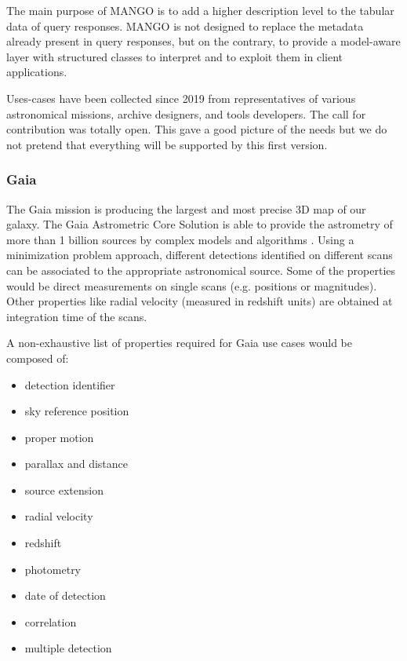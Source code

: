 The main purpose of MANGO is to add a higher description level to the tabular data of query responses.
MANGO is not designed to replace the metadata already present in query responses, but on the contrary, 
to provide a model-aware layer with structured classes to interpret and to exploit them in client applications. 

Uses-cases have been collected since 2019 from representatives of various astronomical 
missions, archive designers, and tools developers.
The call for contribution was totally open. This gave a good picture of the needs but we do not pretend 
that everything will be supported by this first version.

\subsubsection{Gaia}
The Gaia mission is producing the largest and most precise 3D map of our galaxy.
The Gaia Astrometric Core Solution is able to provide the astrometry of more than 1
billion sources by complex models and algorithms \citep{2012A&A...538A..78L}.
Using a minimization problem approach, different detections identified on
different scans can be associated to the appropriate astronomical source. Some of the
properties would be direct measurements on single scans (e.g. positions or
magnitudes). Other properties like radial velocity (measured in redshift
units) are obtained at integration time of the scans.

A non-exhaustive list of properties required for Gaia use cases would be composed
of:

\begin{itemize}[noitemsep,topsep=0pt,parsep=0pt,partopsep=0pt]
    \item detection identifier
    \item sky reference position
    \item proper motion
    \item parallax and distance

    \item source extension
    \item radial velocity
    \item redshift
    \item photometry
    \item date of detection
    \item correlation
    \item multiple detection
\end{itemize}

